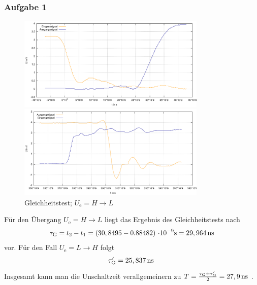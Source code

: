 \documentclass[numbers=noenddot,12pt,a4paper]{scrartcl}
\newcommand{\ix}[1]{_\text{#1}}
\begin{document}
\subsubsection{Aufgabe 1}
\begin{figure}[H]
\centering
\includegraphics[width=0.8\textwidth]{komb1.pdf}
\caption{Gleichheitstest; $U\ix{e}=H\rightarrow L$}
\includegraphics[width=0.8\textwidth]{komb2.pdf}
\end{figure}
Für den Übergang $U\ix{e}=H\rightarrow L$ liegt das Ergebnis des Gleichheitstests nach
\begin{align*}
 \tau\ix{G}=t_2-t_1=\unit[\left(30,8495-0.88482\right)]{\cdot 10^{-9}s}=\unit[29,964]{ns}
\end{align*}
vor. Für den Fall $U\ix{e}=L\rightarrow H$ folgt
\begin{align*}
\tau\ix{G}^{\prime}=\unit[25,837]{ns} \;
\end{align*}
Insgesamt kann man die Unschaltzeit verallgemeinern zu $T=\frac{\tau\ix{G}+\tau\ix{G}^{\prime}}{2}=\unit[27,9]{ns} \;$.
\end{document}

